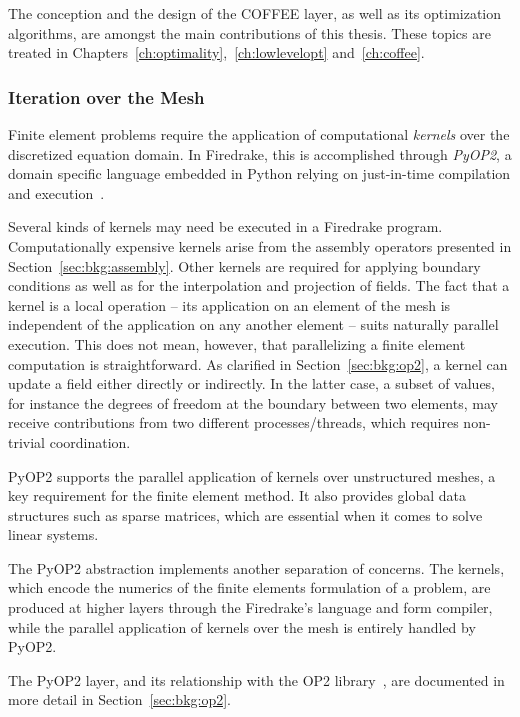 The conception and the design of the COFFEE layer, as well as its optimization algorithms, are amongst the main contributions of this thesis. These topics are treated in Chapters~\ref{ch:optimality},~\ref{ch:lowlevelopt} and~\ref{ch:coffee}.

\subsubsection{Iteration over the Mesh}
\label{sec:bkg:meshiteration}
Finite element problems require the application of computational {\em kernels} over the discretized equation domain. In Firedrake, this is accomplished through {\em PyOP2}, a domain specific language embedded in Python relying on just-in-time compilation and execution~\citep{pyop2isc}. 

Several kinds of kernels may need be executed in a Firedrake program. Computationally expensive kernels arise from the assembly operators presented in Section~\ref{sec:bkg:assembly}. Other kernels are required for applying boundary conditions as well as for the interpolation and projection of fields. The fact that a kernel is a local operation -- its application on an element of the mesh is independent of the application on any another element -- suits naturally parallel execution. This does not mean, however, that parallelizing a finite element computation is straightforward. As clarified in Section~\ref{sec:bkg:op2}, a kernel can update a field either directly or indirectly. In the latter case, a subset of values, for instance the degrees of freedom at the boundary between two elements, may receive contributions from two different processes/threads, which requires non-trivial coordination.

PyOP2 supports the parallel application of kernels over unstructured meshes, a key requirement for the finite element method. It also provides global data structures such as sparse matrices, which are essential when it comes to solve linear systems.

The PyOP2 abstraction implements another separation of concerns. The kernels, which encode the numerics of the finite elements formulation of a problem, are produced at higher layers through the Firedrake's language and form compiler, while the parallel application of kernels over the mesh is entirely handled by PyOP2. 

The PyOP2 layer, and its relationship with the OP2 library~\cite{op2-main}, are documented in more detail in Section~\ref{sec:bkg:op2}.

